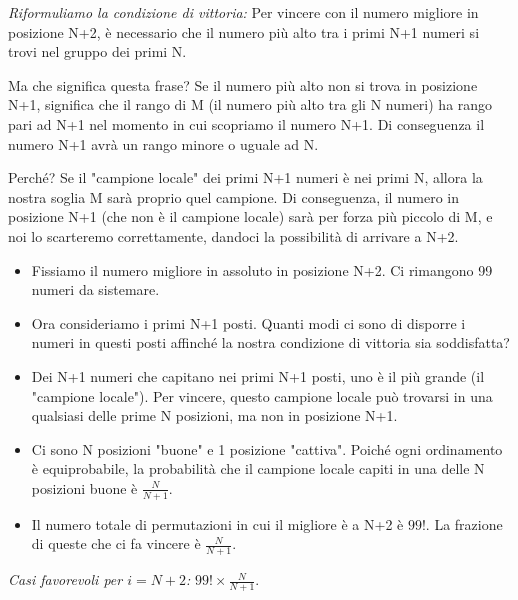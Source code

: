 \begin{itemize}
    \textit{Riformuliamo la condizione di vittoria:} Per vincere con il numero migliore in posizione N+2, è necessario che il numero più alto tra i primi N+1 numeri si trovi nel gruppo dei primi N. 
    
    Ma che significa questa frase? Se il numero più alto non si trova in posizione N+1, significa che il rango di M (il numero più alto tra gli N numeri) ha rango pari ad N+1 nel momento in cui scopriamo il numero N+1. Di conseguenza il numero N+1 avrà un rango minore o uguale ad N.
 
    Perché? Se il "campione locale" dei primi N+1 numeri è nei primi N, allora la nostra soglia M sarà proprio quel campione. Di conseguenza, il numero in posizione N+1 (che non è il campione locale) sarà per forza più piccolo di M, e noi lo scarteremo correttamente, dandoci la possibilità di arrivare a N+2.
    \begin{itemize}
        \item Fissiamo il numero migliore in assoluto in posizione N+2. Ci rimangono 99 numeri da sistemare.
        \item Ora consideriamo i primi N+1 posti. Quanti modi ci sono di disporre i numeri in questi posti affinché la nostra condizione di vittoria sia soddisfatta?
        \item Dei N+1 numeri che capitano nei primi N+1 posti, uno è il più grande (il "campione locale"). Per vincere, questo campione locale può trovarsi in una qualsiasi delle prime N posizioni, ma non in posizione N+1.
        \item Ci sono N posizioni "buone" e 1 posizione "cattiva". Poiché ogni ordinamento è equiprobabile, la probabilità che il campione locale capiti in una delle N posizioni buone è $\frac{N}{N+1}$.
        \item Il numero totale di permutazioni in cui il migliore è a N+2 è $99!$. La frazione di queste che ci fa vincere è $\frac{N}{N+1}$.
    \end{itemize}
    \textit{Casi favorevoli per $i = N+2$:} $99! \times \frac{N}{N+1}$. 
\end{itemize}

